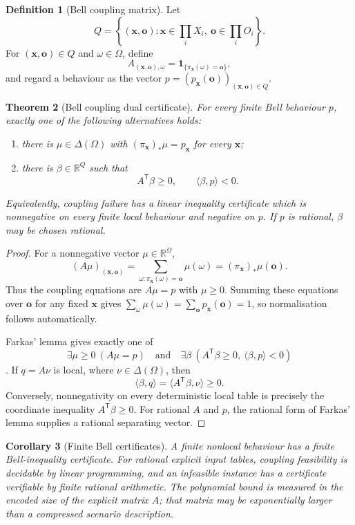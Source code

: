 \documentclass[11pt]{article}
\theoremstyle{plain}
\newtheorem{theorem}{Theorem}[section]
\newtheorem{corollary}[theorem]{Corollary}
\theoremstyle{definition}
\newtheorem{definition}[theorem]{Definition}
\theoremstyle{remark}
\begin{document}
\begin{definition}[Bell coupling matrix]\label{def:bell-matrix}
Let
\[
Q=\left\{(\mathbf x,\mathbf o):
\mathbf x\in\prod_iX_i,\ 
\mathbf o\in\prod_iO_i\right\}.
\]
For $(\mathbf x,\mathbf o)\in Q$ and $\omega\in\Omega$, define
\[
A_{(\mathbf x,\mathbf o),\omega}
=\mathbf 1_{\{\pi_{\mathbf x}(\omega)=\mathbf o\}},
\]
and regard a behaviour as the vector
$p=(p_{\mathbf x}(\mathbf o))_{(\mathbf x,\mathbf o)\in Q}$.
\end{definition}

\begin{theorem}[Bell coupling dual certificate]\label{thm:bell-dual}
For every finite Bell behaviour $p$, exactly one of the following alternatives
holds:
\begin{enumerate}[label=(\roman*)]
\item there is $\mu\in\Delta(\Omega)$ with
$(\pi_{\mathbf x})_*\mu=p_{\mathbf x}$ for every $\mathbf x$;
\item there is $\beta\in\mathbb R^Q$ such that
\[
A^{\mathsf T}\beta\ge0,
\qquad
\langle\beta,p\rangle<0.
\]
\end{enumerate}
Equivalently, coupling failure has a linear inequality certificate which is
nonnegative on every finite local behaviour and negative on $p$. If $p$ is
rational, $\beta$ may be chosen rational.
\end{theorem}

\begin{proof}
For a nonnegative vector $\mu\in\mathbb R^\Omega$,
\[
(A\mu)_{(\mathbf x,\mathbf o)}
=\sum_{\omega:\pi_{\mathbf x}(\omega)=\mathbf o}\mu(\omega)
=(\pi_{\mathbf x})_*\mu(\mathbf o).
\]
Thus the coupling equations are $A\mu=p$ with $\mu\ge0$. Summing these
equations over $\mathbf o$ for any fixed $\mathbf x$ gives
$\sum_\omega\mu(\omega)=\sum_{\mathbf o}p_{\mathbf x}(\mathbf o)=1$, so
normalisation follows automatically.

Farkas' lemma gives exactly one of
\[
\exists\mu\ge0\ (A\mu=p)
\quad\text{and}\quad
\exists\beta\ (A^{\mathsf T}\beta\ge0,
\ \langle\beta,p\rangle<0)
\]
\cite{schrijver}. If $q=A\nu$ is local, where
$\nu\in\Delta(\Omega)$, then
\[
\langle\beta,q\rangle
=\langle A^{\mathsf T}\beta,\nu\rangle\ge0.
\]
Conversely, nonnegativity on every deterministic local table is precisely the
coordinate inequality $A^{\mathsf T}\beta\ge0$. For rational $A$ and $p$, the
rational form of Farkas' lemma supplies a rational separating vector.
\end{proof}

\begin{corollary}[Finite Bell certificates]\label{cor:bell-certificates}
A finite nonlocal behaviour has a finite Bell-inequality certificate. For
rational explicit input tables, coupling feasibility is decidable by linear
programming, and an infeasible instance has a certificate verifiable by finite
rational arithmetic. The polynomial bound is measured in the encoded size of
the explicit matrix $A$; that matrix may be exponentially larger than a
compressed scenario description.
\end{corollary}
\end{document}
